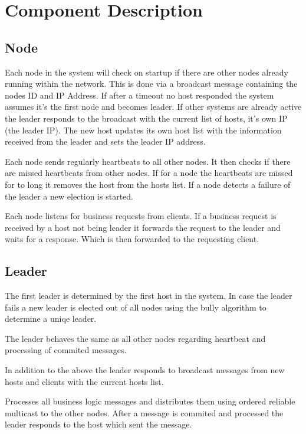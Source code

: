\chapter{Component Description}\label{ch:ComponentDescription}
\section{Node}\label{Node}
Each node in the system will check on startup if there are other nodes already running within the network. This is done via a broadcast message containing the nodes ID and IP Address. If after a timeout no host responded the system assumes it's the first node and becomes leader. If other systems are already active the leader responds to the broadcast with the current list of hosts, it's own IP (the leader IP). The new host updates its own host list with the information received from the leader and sets the leader IP address. 

Each node sends regularly heartbeats to all other nodes. It then checks if there are missed heartbeats from other nodes. If for a node the heartbeats are missed for to long it removes the host from the hosts list.
If a node detects a failure of the leader a new election is started.

Each node listens for business requests from clients. If a business request is received by a host not being leader it forwards the request to the leader and waits for a response. Which is then forwarded to the requesting client.

\section{Leader}\label{sec:Leader}
The first leader is determined by the first host in the system. 
In case the leader fails a new leader is elected out of all nodes using the bully algorithm to determine a uniqe leader.

The leader behaves the same as all other nodes regarding heartbeat and processing of commited messages.

In addition to the above the leader responds to broadcast messages from new hosts and clients with the current hosts list.

Processes all business logic messages and distributes them using ordered reliable multicast to the other nodes. After a message is commited and processed the leader responds to the host which sent the message.



